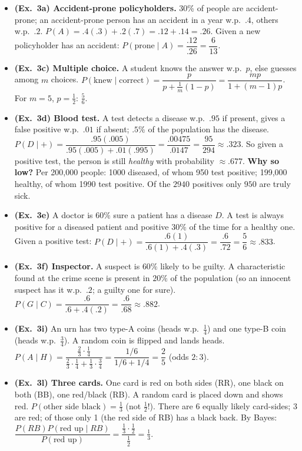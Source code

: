 \documentclass[11pt]{article}
\begin{document}
\begin{exbox}
\begin{itemize}
\item \textbf{(Ex.\ 3a) Accident-prone policyholders.} 30\% of people are accident-prone; an accident-prone person has an accident in a year w.p.\ $.4$, others w.p.\ $.2$. $P(A)=.4(.3)+.2(.7)=.12+.14=.26$. Given a new policyholder has an accident: $P(\text{prone}\mid A)=\dfrac{.12}{.26}=\dfrac6{13}$.
\item \textbf{(Ex.\ 3c) Multiple choice.} A student knows the answer w.p.\ $p$, else guesses among $m$ choices. $P(\text{knew}\mid\text{correct})=\dfrac{p}{p+\frac1m(1-p)}=\dfrac{mp}{1+(m-1)p}$. For $m=5$, $p=\tfrac12$: $\tfrac56$.
\item \textbf{(Ex.\ 3d) Blood test.} A test detects a disease w.p.\ $.95$ if present, gives a false positive w.p.\ $.01$ if absent; $.5\%$ of the population has the disease. $P(D\mid+)=\dfrac{.95(.005)}{.95(.005)+.01(.995)}=\dfrac{.00475}{.0147}=\dfrac{95}{294}\approx.323$. So given a positive test, the person is still \emph{healthy} with probability $\approx.677$. \textbf{Why so low?} Per 200{,}000 people: 1000 diseased, of whom 950 test positive; 199{,}000 healthy, of whom 1990 test positive. Of the $2940$ positives only $950$ are truly sick.
\item \textbf{(Ex.\ 3e)} A doctor is $60\%$ sure a patient has a disease $D$. A test is always positive for a diseased patient and positive $30\%$ of the time for a healthy one. Given a positive test: $P(D\mid+)=\dfrac{.6(1)}{.6(1)+.4(.3)}=\dfrac{.6}{.72}=\dfrac56\approx.833$.
\item \textbf{(Ex.\ 3f) Inspector.} A suspect is $60\%$ likely to be guilty. A characteristic found at the crime scene is present in $20\%$ of the population (so an innocent suspect has it w.p.\ $.2$; a guilty one for sure). $P(G\mid C)=\dfrac{.6}{.6+.4(.2)}=\dfrac{.6}{.68}\approx.882$.
\item \textbf{(Ex.\ 3i)} An urn has two type-A coins (heads w.p.\ $\tfrac14$) and one type-B coin (heads w.p.\ $\tfrac34$). A random coin is flipped and lands heads. $P(A\mid H)=\dfrac{\frac23\cdot\frac14}{\frac23\cdot\frac14+\frac13\cdot\frac34}=\dfrac{1/6}{1/6+1/4}=\dfrac25$ (odds $2:3$).
\item \textbf{(Ex.\ 3l) Three cards.} One card is red on both sides (RR), one black on both (BB), one red/black (RB). A random card is placed down and shows red. $P(\text{other side black})=\tfrac13$ (not $\tfrac12$!). There are 6 equally likely card-sides; 3 are red; of those only 1 (the red side of RB) has a black back. By Bayes: $\dfrac{P(RB)P(\text{red up}\mid RB)}{P(\text{red up})}=\dfrac{\frac13\cdot\frac12}{\frac12}=\tfrac13$.

\end{itemize}
\end{exbox}
\end{document}
